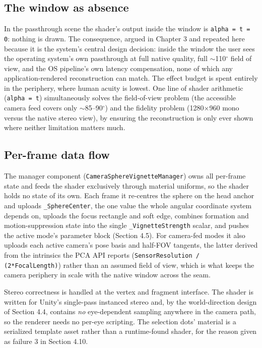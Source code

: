 \subsection{The window as absence}

In the passthrough scene the shader's output inside the window is \verb|alpha = t = 0|: nothing is drawn.
The consequence, argued in Chapter 3 and repeated here because it is the system's central design
decision: inside the window the user sees the operating system's own passthrough at full native
quality, full $\sim$110$^{\circ}$ field of view, and the OS pipeline's own latency compensation, none of which
any application-rendered reconstruction can match. The effect budget is spent entirely in the
periphery, where human acuity is lowest. One line of shader arithmetic (\verb|alpha = t|) simultaneously
solves the field-of-view problem (the accessible camera feed covers only $\sim$85–90$^{\circ}$) and the fidelity
problem (1280$\times$960 mono versus the native stereo view), by ensuring the reconstruction is only ever
shown where neither limitation matters much.

\subsection{Per-frame data flow}

The manager component (\verb|CameraSphereVignetteManager|) owns all per-frame state and feeds the
shader exclusively through material uniforms, so the shader holds no state of its own. Each frame it
re-centres the sphere on the head anchor and uploads \verb|_SphereCenter|, the one value the whole
angular coordinate system depends on, uploads the focus rectangle and soft edge, combines formation
and motion-suppression state into the single \verb|_VignetteStrength| scalar, and pushes the active
mode's parameter block (Section 4.5). For camera-fed modes it also uploads each active camera's pose
basis and half-FOV tangents, the latter derived from the intrinsics the PCA API reports
(\verb|SensorResolution / (2*FocalLength)|) rather than an assumed field of view, which is what keeps
the camera periphery in scale with the native window across the seam.

Stereo correctness is handled at the vertex and fragment interface. The shader is written for Unity's
single-pass instanced stereo and, by the world-direction design of Section 4.4, contains \textit{no}
eye-dependent sampling anywhere in the camera path, so the renderer needs no per-eye scripting. The
selection dots' material is a serialized template asset rather than a runtime-found shader, for the
reason given as failure 3 in Section 4.10.

